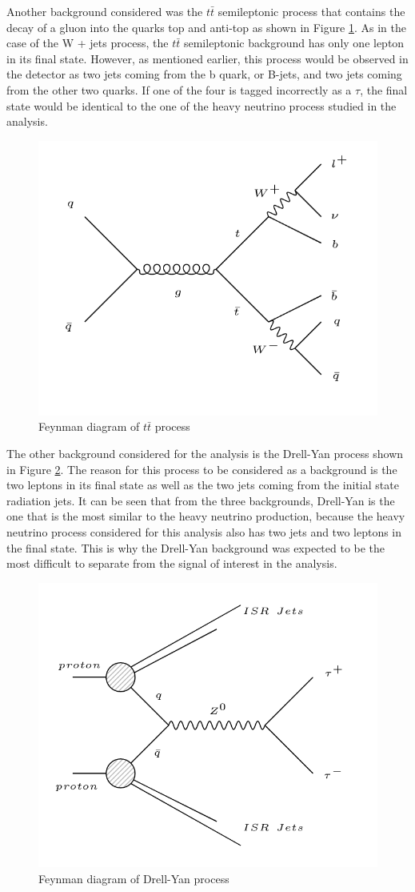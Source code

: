 Another background considered was the $t\bar{t}$ semileptonic process that contains the decay of a gluon into the quarks top and anti-top as shown in Figure \ref{fig: ttbar_background}. As in the case of the W + jets process, the $t\bar{t}$ semileptonic background has only one lepton in its final state. However, as mentioned earlier, this process would be observed in the detector as two jets coming from the b quark, or B-jets, and two jets coming from the other two quarks. If one of the four is tagged incorrectly as a $\tau$, the final state would be identical to the one of the heavy neutrino process studied in the analysis.


\begin{figure}[H]
\centering
\includegraphics[width = \linewidth]{ttbar}
\caption{Feynman diagram of $t\bar{t}$ process}
\label{fig: ttbar_background}
\end{figure}

The other background considered for the analysis is the Drell-Yan process shown in Figure \ref{fig: DY_background}. The reason for this process to be considered as a background is the two leptons in its final state as well as the two jets coming from the initial state radiation jets. It can be seen that from the three backgrounds, Drell-Yan is the one that is the most similar to the heavy neutrino production, because the heavy neutrino process considered for this analysis also has two jets and two leptons in the final state. This is why the Drell-Yan background was expected to be the most difficult to separate from the signal of interest in the analysis.

\begin{figure}[H]
\centering
\includegraphics[width = 0.7\linewidth]{Drell-Yan}
\caption{Feynman diagram of Drell-Yan process}
\label{fig: DY_background}
\end{figure}